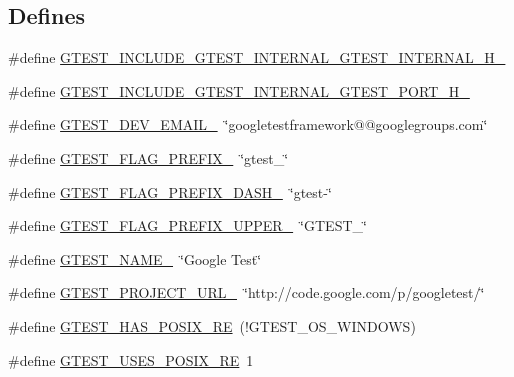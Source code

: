 \subsection*{\-Defines}
\begin{DoxyCompactItemize}
\item 
\#define \hyperlink{fused-src_2gtest_2gtest_8h_a508d33581439542ea940eacbf306ad2a}{\-G\-T\-E\-S\-T\-\_\-\-I\-N\-C\-L\-U\-D\-E\-\_\-\-G\-T\-E\-S\-T\-\_\-\-I\-N\-T\-E\-R\-N\-A\-L\-\_\-\-G\-T\-E\-S\-T\-\_\-\-I\-N\-T\-E\-R\-N\-A\-L\-\_\-\-H\-\_\-}
\item 
\#define \hyperlink{fused-src_2gtest_2gtest_8h_a6d13def13619ff1647c90e3354a65732}{\-G\-T\-E\-S\-T\-\_\-\-I\-N\-C\-L\-U\-D\-E\-\_\-\-G\-T\-E\-S\-T\-\_\-\-I\-N\-T\-E\-R\-N\-A\-L\-\_\-\-G\-T\-E\-S\-T\-\_\-\-P\-O\-R\-T\-\_\-\-H\-\_\-}
\item 
\#define \hyperlink{fused-src_2gtest_2gtest_8h_a21086d276b1a64d6763ee8a94b12c1b8}{\-G\-T\-E\-S\-T\-\_\-\-D\-E\-V\-\_\-\-E\-M\-A\-I\-L\-\_\-}~\char`\"{}googletestframework@@googlegroups.\-com\char`\"{}
\item 
\#define \hyperlink{fused-src_2gtest_2gtest_8h_a088e84784c589ba9b1fc48602ad8eabf}{\-G\-T\-E\-S\-T\-\_\-\-F\-L\-A\-G\-\_\-\-P\-R\-E\-F\-I\-X\-\_\-}~\char`\"{}gtest\-\_\-\char`\"{}
\item 
\#define \hyperlink{fused-src_2gtest_2gtest_8h_a4251ff898f9f94ec6b8b9402c3436759}{\-G\-T\-E\-S\-T\-\_\-\-F\-L\-A\-G\-\_\-\-P\-R\-E\-F\-I\-X\-\_\-\-D\-A\-S\-H\-\_\-}~\char`\"{}gtest-\/\char`\"{}
\item 
\#define \hyperlink{fused-src_2gtest_2gtest_8h_a4018b7f288f974d022df397e2730633a}{\-G\-T\-E\-S\-T\-\_\-\-F\-L\-A\-G\-\_\-\-P\-R\-E\-F\-I\-X\-\_\-\-U\-P\-P\-E\-R\-\_\-}~\char`\"{}\-G\-T\-E\-S\-T\-\_\-\char`\"{}
\item 
\#define \hyperlink{fused-src_2gtest_2gtest_8h_a13d98c217176bd8722c395b9225fc19d}{\-G\-T\-E\-S\-T\-\_\-\-N\-A\-M\-E\-\_\-}~\char`\"{}\-Google \-Test\char`\"{}
\item 
\#define \hyperlink{fused-src_2gtest_2gtest_8h_a5aa3c938fc1d049f1d9c5332f6a0b1d4}{\-G\-T\-E\-S\-T\-\_\-\-P\-R\-O\-J\-E\-C\-T\-\_\-\-U\-R\-L\-\_\-}~\char`\"{}http\-://code.\-google.\-com/p/googletest/\char`\"{}
\item 
\#define \hyperlink{fused-src_2gtest_2gtest_8h_af5c4295ea1d76f07f65934f659792431}{\-G\-T\-E\-S\-T\-\_\-\-H\-A\-S\-\_\-\-P\-O\-S\-I\-X\-\_\-\-R\-E}~(!\-G\-T\-E\-S\-T\-\_\-\-O\-S\-\_\-\-W\-I\-N\-D\-O\-W\-S)
\item 
\#define \hyperlink{fused-src_2gtest_2gtest_8h_acecef794eeb09598cd47da764271cb18}{\-G\-T\-E\-S\-T\-\_\-\-U\-S\-E\-S\-\_\-\-P\-O\-S\-I\-X\-\_\-\-R\-E}~1

\end{DoxyCompactItemize}
